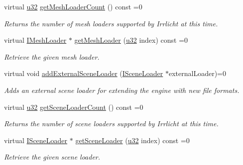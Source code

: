 \begin{DoxyCompactItemize}
virtual \hyperlink{namespaceirr_a0416a53257075833e7002efd0a18e804}{u32} \hyperlink{classirr_1_1scene_1_1ISceneManager_abb3fc9803b7de0cf7177042bd24508ad}{get\+Mesh\+Loader\+Count} () const =0
\begin{DoxyCompactList}\small\item\em Returns the number of mesh loaders supported by Irrlicht at this time. \end{DoxyCompactList}\item 
virtual \hyperlink{classirr_1_1scene_1_1IMeshLoader}{I\+Mesh\+Loader} $\ast$ \hyperlink{classirr_1_1scene_1_1ISceneManager_afabf244b50875a52eb42d5d375fa40d4}{get\+Mesh\+Loader} (\hyperlink{namespaceirr_a0416a53257075833e7002efd0a18e804}{u32} index) const =0
\begin{DoxyCompactList}\small\item\em Retrieve the given mesh loader. \end{DoxyCompactList}\item 
virtual void \hyperlink{classirr_1_1scene_1_1ISceneManager_a8f0bc0221c4faaca80ac8f560ee424ef}{add\+External\+Scene\+Loader} (\hyperlink{classirr_1_1scene_1_1ISceneLoader}{I\+Scene\+Loader} $\ast$external\+Loader)=0
\begin{DoxyCompactList}\small\item\em Adds an external scene loader for extending the engine with new file formats. \end{DoxyCompactList}\item 
\mbox{\label{classirr_1_1scene_1_1ISceneManager_a3e5cd3e93d3ed711df7692c830c5a58a}} 
virtual \hyperlink{namespaceirr_a0416a53257075833e7002efd0a18e804}{u32} \hyperlink{classirr_1_1scene_1_1ISceneManager_a3e5cd3e93d3ed711df7692c830c5a58a}{get\+Scene\+Loader\+Count} () const =0
\begin{DoxyCompactList}\small\item\em Returns the number of scene loaders supported by Irrlicht at this time. \end{DoxyCompactList}\item 
virtual \hyperlink{classirr_1_1scene_1_1ISceneLoader}{I\+Scene\+Loader} $\ast$ \hyperlink{classirr_1_1scene_1_1ISceneManager_a504fd792634ce0fbace4d13e70e4efab}{get\+Scene\+Loader} (\hyperlink{namespaceirr_a0416a53257075833e7002efd0a18e804}{u32} index) const =0
\begin{DoxyCompactList}\small\item\em Retrieve the given scene loader. \end{DoxyCompactList}\item 

\end{DoxyCompactItemize}
